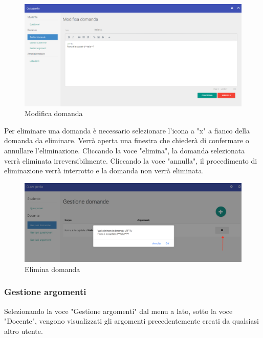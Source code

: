 \documentclass[12pt,a4paper]{article}
\begin{document}
		\begin{figure}[H]	
			\centering
			\includegraphics[width=\linewidth]{../img/screenshot/modificaDomanda.png}
			\caption{Modifica domanda}
			\label{Modifica domanda}
		\end{figure}
	
	
	\par Per eliminare una domanda è necessario selezionare l'icona a "x" a fianco della domanda da eliminare.
	Verrà aperta una finestra che chiederà di confermare o annullare l'eliminazione. Cliccando la voce "elimina", la domanda selezionata verrà eliminata irreversibilmente. Cliccando la voce "annulla", il procedimento di eliminazione verrà interrotto e la domanda non verrà eliminata. \\
	
	\begin{figure}[H]	
		\centering
		\includegraphics[width=1.0\linewidth]{../img/screenshot/eliminaDomanda.png}
		\caption{Elimina domanda}
		\label{Elimina domanda}
	\end{figure}
		
	\subsubsection{Gestione argomenti}
	\par Selezionando la voce "Gestione argomenti" dal menu a lato, sotto la voce "Docente", vengono visualizzati gli argomenti precedentemente creati da qualsiasi altro utente.
	
\end{document}
